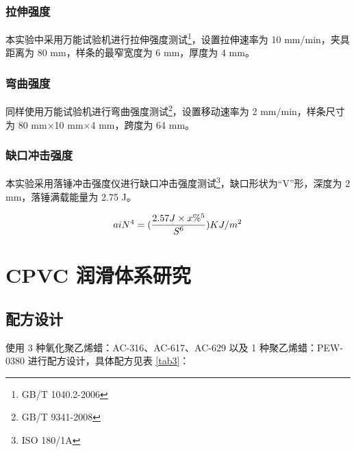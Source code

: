 \documentclass[a4paper, oneside, onecolumn, 12pt]{ctexrep}    %
\begin{document}
\subsection{拉伸强度}
本实验中采用万能试验机进行拉伸强度测试\footnote{GB/T 1040.2-2006}，设置拉伸速率为 10 mm/min，夹具距离为 80 mm，样条的最窄宽度为 6 mm，厚度为 4 mm。

\subsection{弯曲强度}
同样使用万能试验机进行弯曲强度测试\footnote{GB/T 9341-2008}，设置移动速率为 2 mm/min，样条尺寸为 80 mm$\times$10 mm$\times$4 mm，跨度为 64 mm。

\subsection{缺口冲击强度}
本实验采用落锤冲击强度仪进行缺口冲击强度测试\footnote{ISO 180/1A}，缺口形状为“V”形，深度为 2 mm，落锤满载能量为 2.75 J。

\begin{equation}
aiN\footnotemark[4] = (\frac{2.57 J \times x\%\footnotemark[5]}{S\footnotemark[6]}) KJ/m^2
\end{equation}



\chapter{CPVC 润滑体系研究}

\section{配方设计}
使用 3 种氧化聚乙烯蜡：AC-316、AC-617、AC-629 以及 1 种聚乙烯蜡：PEW-0380 进行配方设计，具体配方见表 \ref{tab3}：
\end{document}
